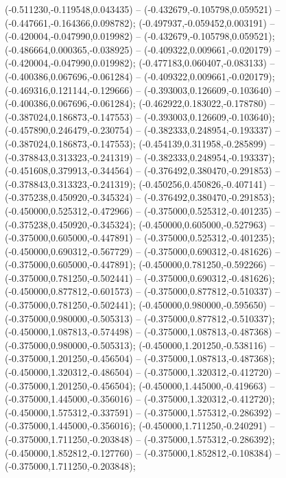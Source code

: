  (-0.511230,-0.119548,0.043435) -- (-0.432679,-0.105798,0.059521) -- (-0.447661,-0.164366,0.098782);
 (-0.497937,-0.059452,0.003191) -- (-0.420004,-0.047990,0.019982) -- (-0.432679,-0.105798,0.059521);
 (-0.486664,0.000365,-0.038925) -- (-0.409322,0.009661,-0.020179) -- (-0.420004,-0.047990,0.019982);
 (-0.477183,0.060407,-0.083133) -- (-0.400386,0.067696,-0.061284) -- (-0.409322,0.009661,-0.020179);
 (-0.469316,0.121144,-0.129666) -- (-0.393003,0.126609,-0.103640) -- (-0.400386,0.067696,-0.061284);
 (-0.462922,0.183022,-0.178780) -- (-0.387024,0.186873,-0.147553) -- (-0.393003,0.126609,-0.103640);
 (-0.457890,0.246479,-0.230754) -- (-0.382333,0.248954,-0.193337) -- (-0.387024,0.186873,-0.147553);
 (-0.454139,0.311958,-0.285899) -- (-0.378843,0.313323,-0.241319) -- (-0.382333,0.248954,-0.193337);
 (-0.451608,0.379913,-0.344564) -- (-0.376492,0.380470,-0.291853) -- (-0.378843,0.313323,-0.241319);
 (-0.450256,0.450826,-0.407141) -- (-0.375238,0.450920,-0.345324) -- (-0.376492,0.380470,-0.291853);
 (-0.450000,0.525312,-0.472966) -- (-0.375000,0.525312,-0.401235) -- (-0.375238,0.450920,-0.345324);
 (-0.450000,0.605000,-0.527963) -- (-0.375000,0.605000,-0.447891) -- (-0.375000,0.525312,-0.401235);
 (-0.450000,0.690312,-0.567729) -- (-0.375000,0.690312,-0.481626) -- (-0.375000,0.605000,-0.447891);
 (-0.450000,0.781250,-0.592266) -- (-0.375000,0.781250,-0.502441) -- (-0.375000,0.690312,-0.481626);
 (-0.450000,0.877812,-0.601573) -- (-0.375000,0.877812,-0.510337) -- (-0.375000,0.781250,-0.502441);
 (-0.450000,0.980000,-0.595650) -- (-0.375000,0.980000,-0.505313) -- (-0.375000,0.877812,-0.510337);
 (-0.450000,1.087813,-0.574498) -- (-0.375000,1.087813,-0.487368) -- (-0.375000,0.980000,-0.505313);
 (-0.450000,1.201250,-0.538116) -- (-0.375000,1.201250,-0.456504) -- (-0.375000,1.087813,-0.487368);
 (-0.450000,1.320312,-0.486504) -- (-0.375000,1.320312,-0.412720) -- (-0.375000,1.201250,-0.456504);
 (-0.450000,1.445000,-0.419663) -- (-0.375000,1.445000,-0.356016) -- (-0.375000,1.320312,-0.412720);
 (-0.450000,1.575312,-0.337591) -- (-0.375000,1.575312,-0.286392) -- (-0.375000,1.445000,-0.356016);
 (-0.450000,1.711250,-0.240291) -- (-0.375000,1.711250,-0.203848) -- (-0.375000,1.575312,-0.286392);
 (-0.450000,1.852812,-0.127760) -- (-0.375000,1.852812,-0.108384) -- (-0.375000,1.711250,-0.203848);
